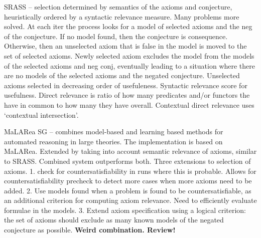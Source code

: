 \documentclass{article}
\begin{document}
SRASS \cite{SRASS} -- selection determined by semantics of the axioms and
conjecture, heuristically ordered by a syntactic relevance measure. Many
problems more solved. At each iter the process looks for a model of selected
axioms and the neg of the conjecture. If no model found, then the conjecture is
consequence. Otherwise, then an unselected axiom that is false in the model is
moved to the set of selected axioms. Newly selected axiom excludes the model
from the models of the selected axioms and neg conj, eventually leading to
a situation where there are no models of the selected axioms and the negated
conjecture. Unselected axioms selected in decreasing order of usefuleness.
Syntactic relevance score for usefulness. Direct relevance is ratio of how many
predicates and/or functors the have in common to how many they have overall.
Contextual direct relevance uses `contextual intersection'.

MaLARea SG \cite{MaLAReaSG} -- combines model-based and learning based methods
for automated reasoning in large theories. The implementation is based on
MaLARea. Extended by taking into account semantic relevance of axioms, similar
to SRASS. Combined system outperforms both. Three extensions to selection of
axioms. 1. check for countersatisfiability in runs where this is probable.
Allows for countersatisfiability precheck to detect more cases when more axioms
need to be added. 2. Use models found when a problem is found to be
countersatisfiable, as an additional criterion for computing axiom relevance.
Need to efficiently evaluate formulae in the models. 3. Extend axiom
specification using a logical criterion: the set of axioms should exclude as
many known models of the negated conjecture as possible. \textbf{Weird
combination. Review!}



\end{document}
